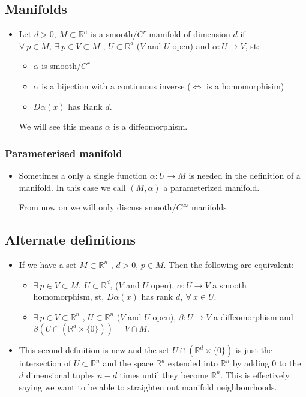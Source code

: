\documentclass[11pt]{article}
\DeclareRobustCommand{\RR}{\mathbb{R}}
\numberwithin{equation}{section}
\begin{document}
\subsection{Manifolds}
\begin{itemize}
    \item Let $d>0$, $M \subset \RR^n$ is a smooth/$C^r$ manifold of dimension $d$ if $\forall~p \in M,~\exists~ p\in V \subset M$ , $U \subset \RR^d$ ($V$ and $U$ open) and $\alpha: U \rightarrow V$, st: 
\begin{itemize}
    \item $\alpha$ is smooth/$C^r$ 
    \item $\alpha$ is a bijection with a continuous inverse ($\iff$ is a homomorphisim) 
    \item $D\alpha(x)$ has Rank $d$. 
\end{itemize}
We will see this means $\alpha$ is a diffeomorphism. 

\end{itemize}


\subsubsection{Parameterised manifold}
\begin{itemize}
    \item Sometimes a only a single function $\alpha:U \rightarrow M$ is needed in the definition of a manifold. In this case we call $(M,\alpha)$ a parameterized manifold. 

From now on we will only discuss smooth/$C^{\infty}$ manifolds  
\end{itemize}

\subsection{Alternate definitions}
\begin{itemize}
    \item If we have a set $M \subset \RR^n$ , $d>0$, $p\in M$. Then the following are equivalent: 
\begin{itemize}
    \item $\exists~p \in V \subset M,~ U \subset \RR^d$, ($V$ and $U$ open), $\alpha: U \rightarrow V$ a smooth homomorphism, st, $D \alpha(x)$ has rank $d,~\forall ~x \in U $.  
    \item $\exists~ p\in V \subset    \RR^n$ , $ U \subset \RR^n$ ($V$ and $U$ open),  $\beta: U \rightarrow V$ a diffeomorphism and $\beta(U \cap(\RR^d \times \{0\})) = V \cap M$. 

\end{itemize}
\item This second definition is new and the set $U \cap(\RR^d \times \{0\})$ is just the intersection of $U \subset \RR^n$ and the space $\RR^d$ extended into $\RR^n$ by adding $0$ to the $d$ dimensional tuples $n-d$ times until they become $\RR^n$.  This is effectively saying we want to be able to straighten out manifold neighbourhoods. 
\end{itemize}
\end{document}
